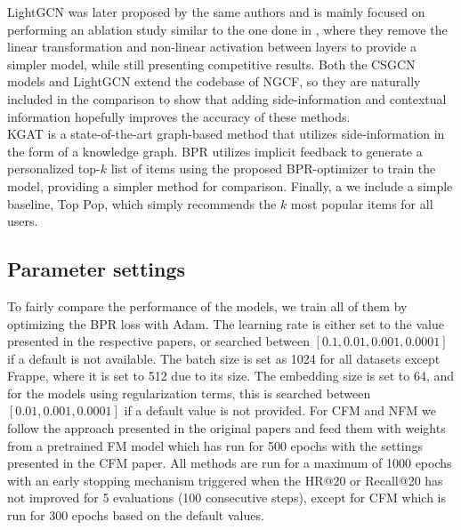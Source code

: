LightGCN was later proposed by the same authors and is mainly focused on performing an ablation study similar to the one done in \cite{SimplifyingGCN}, where they remove the linear transformation and non-linear activation between layers to provide a simpler model, while still presenting competitive results.
Both the CSGCN models and LightGCN extend the codebase of NGCF, so they are naturally included in the comparison to show that adding side-information and contextual information hopefully improves the accuracy of these methods.\\
KGAT is a state-of-the-art graph-based method that utilizes side-information in the form of a knowledge graph.
BPR utilizes implicit feedback to generate a personalized top-$k$ list of items using the proposed BPR-optimizer to train the model, providing a simpler method for comparison.
Finally, a we include a simple baseline, Top Pop, which simply recommends the $k$ most popular items for all users.

\subsection{Parameter settings}
To fairly compare the performance of the models, we train all of them by optimizing the BPR loss with Adam.
The learning rate is either set to the value presented in the respective papers, or searched between $[0.1, 0.01, 0.001, 0.0001]$ if a default is not available.
The batch size is set as 1024 for all datasets except Frappe, where it is set to 512 due to its size.
The embedding size is set to 64, and for the models using regularization terms, this is searched between $[0.01, 0.001, 0.0001]$ if a default value is not provided.
For CFM and NFM we follow the approach presented in the original papers and feed them with weights from a pretrained FM model which has run for 500 epochs with the settings presented in the CFM paper.
All methods are run for a maximum of 1000 epochs with an early stopping mechanism triggered when the HR@20 or Recall@20 has not improved for 5 evaluations (100 consecutive steps), except for CFM which is run for 300 epochs based on the default values.


